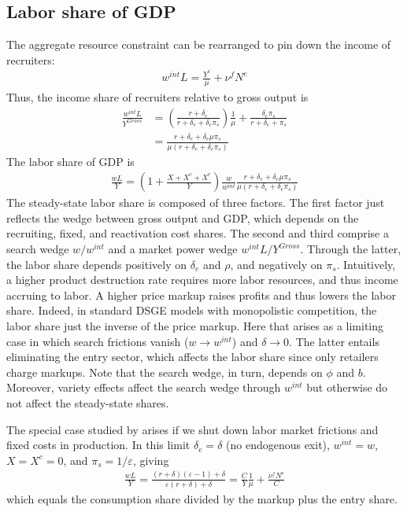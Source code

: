 \documentclass[authoryear, review, 12pt]{elsarticle}
\newcommand{\pfrac}[2]{\left(\dfrac{#1}{#2}\right)}
\renewcommand{\pfrac}[2]{\left(\frac{#1}{#2}\right)}
\begin{document}
\subsection{Labor share of GDP}
	The aggregate resource constraint can be rearranged to pin down the income of recruiters:
	\begin{align}
		w^{int}L=\frac{Y^c}{\mu}+\nu^f N^e
	\end{align}
	Thus, the income share of recruiters relative to gross output is
	\begin{align}
		\frac{w^{int}L}{Y^{Gross}}&=\pfrac{r+\delta_e}{r+\delta_e+\delta_e \pi_s}\frac{1}{\mu}+\frac{\delta_e\pi_s}{r+\delta_e+\pi_s}\\
		&=\frac{r+\delta_e+\delta_e \mu \pi_s}{\mu(r+\delta_e+\delta_e\pi_s)}
	\end{align}
	The labor share of GDP is
	\begin{align}
		\frac{wL}{Y} = (1+\frac{X+X^c+X^r}{Y})\frac{w}{w^{int}}\frac{r+\delta_e+\delta_e \mu \pi_s}{\mu(r+\delta_e+\delta_e\pi_s)}
	\end{align}
	The steady-state labor share is composed of three factors. The first factor just reflects the wedge between gross output and GDP, which depends on the recruiting, fixed, and reactivation cost shares. The second and third comprise a search wedge $w/w^{int}$ and a market power wedge $w^{int}L/Y^{Gross}$. Through the latter, the labor share depends positively on $\delta_e$ and $\rho$, and negatively on $\pi_s$. Intuitively, a higher product destruction rate requires more labor resources, and thus income accruing to labor. A higher price markup raises profits and thus lowers the labor share. Indeed, in standard DSGE models with monopolistic competition, the labor share just the inverse of the price markup. Here that arises as a limiting case in which search frictions vanish ($w\to w^{int}$) and $\delta \to 0$. The latter entails eliminating the entry sector, which affects the labor share since only retailers charge markups. Note that the search wedge, in turn, depends on $\phi$ and $b$. Moreover, variety effects affect the search wedge through $w^{int}$ but otherwise do not affect the steady-state shares.
	
	The special case studied by \citet{bilbiie_2012} arises if we shut down labor market frictions and fixed costs in production. In this limit $\delta_e=\delta$ (no endogenous exit), $w^{int}=w$, $X=X^c=0$, and $\pi_s=1/\varepsilon$, giving
	\begin{align}
		\frac{wL}{Y}=\frac{(r+\delta)(\varepsilon-1)+\delta}{\varepsilon(r+\delta)+\delta}=\frac{C}{Y}\frac{1}{\mu}+\frac{\nu^f N^e}{C}
	\end{align}
	which equals the consumption share divided by the markup plus the entry share.
	
\end{document}
